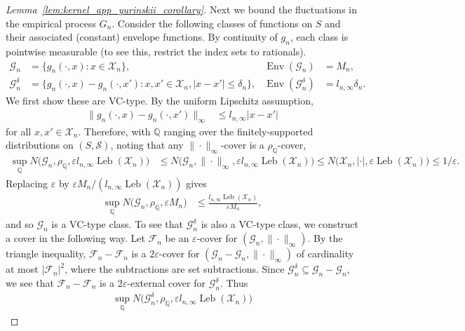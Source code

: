 \documentclass[11pt,lof]{puthesis}
\newcommand{\Q}{\ensuremath{\mathbb{Q}}}
\newcommand{\cF}{\ensuremath{\mathcal{F}}}
\newcommand{\cX}{\ensuremath{\mathcal{X}}}
\newcommand{\cG}{\ensuremath{\mathcal{G}}}
\newcommand{\cS}{\ensuremath{\mathcal{S}}}
\DeclareMathOperator{\Env}{Env}
\DeclareMathOperator{\Leb}{Leb}
\theoremstyle{break}
\theoremstyle{proof}
\newtheorem{proof}{Proof}
\begin{document}
\begin{proof}[Lemma~\ref{lem:kernel_app_yurinskii_corollary}]
  Next we bound the fluctuations in
  the empirical process $G_n$.
  Consider the following classes of functions on $S$
  and their associated (constant) envelope functions.
  By continuity of $g_n$,
  each class is pointwise measurable
  (to see this, restrict the index sets to rationals).
  \begin{align*}
    \cG_n
    &=
    \big\{
      g_n(\cdot, x):
      x \in \cX_n
    \big\},
    &\Env(\cG_n)
    &=
    M_n, \\
    \cG_n^\delta
    &=
    \big\{
      g_n(\cdot, x)
      - g_n(\cdot, x'):
      x, x' \in \cX_n,
      |x-x'| \leq \delta_n
    \big\},
    &\Env(\cG_n^\delta)
    &=
    l_{n,\infty} \delta_n.
  \end{align*}
  We first show these are VC-type.
  By the uniform Lipschitz assumption,
  \begin{align*}
    \big\|
    g_n(\cdot, x)
    - g_n(\cdot, x')
    \big\|_\infty
    &\leq l_{n,\infty} |x-x'|
  \end{align*}
  for all $x,x' \in \cX_n$.
  Therefore, with $\Q$ ranging over the
  finitely-supported distributions
  on $(S, \cS)$,
  noting that any $\|\cdot\|_\infty$-cover
  is a $\rho_\Q$-cover,
  \begin{align*}
    \sup_\Q
    N\big(\cG_n, \rho_\Q, \varepsilon l_{n,\infty} \!\Leb(\cX_n)\big)
    &\leq
    N\big(\cG_n, \|\cdot\|_\infty,
    \varepsilon l_{n,\infty} \!\Leb(\cX_n)\big)
    \leq
    N\big(\cX_n, |\cdot|, \varepsilon \!\Leb(\cX_n)\big)
    \leq
    1/\varepsilon.
  \end{align*}
  Replacing $\varepsilon$ by
  $\varepsilon M_n/(l_{n,\infty} \Leb(\cX_n))$
  gives
  \begin{align*}
    \sup_\Q
    N\big(\cG_n, \rho_\Q, \varepsilon M_n \big)
    &\leq
    \frac{l_{n,\infty} \Leb(\cX_n)}{\varepsilon M_n},
  \end{align*}
  and so $\cG_n$
  is a VC-type class.
  To see that $\cG_n^\delta$
  is also a VC-type class,
  we construct a cover in the following way.
  Let $\cF_n$ be an $\varepsilon$-cover
  for $(\cG_n, \|\cdot\|_\infty)$.
  By the triangle inequality,
  $\cF_n - \cF_n$ is a $2\varepsilon$-cover
  for $(\cG_n - \cG_n, \|\cdot\|_\infty)$
  of cardinality at most $|\cF_n|^2$,
  where the subtractions are set subtractions.
  Since $\cG_n^\delta \subseteq \cG_n - \cG_n$,
  we see that $\cF_n - \cF_n$ is a $2\varepsilon$-external cover
  for $\cG_n^\delta$. Thus
  \begin{align*}
    \sup_\Q
    N\big(\cG_n^\delta, \rho_\Q, \varepsilon l_{n,\infty} \Leb(\cX_n)\big)

\end{align*}
\end{proof}
\end{document}
